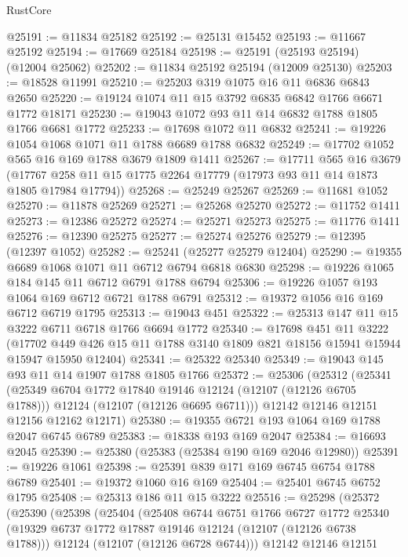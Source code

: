 \begin{lexlean}{RustCore}
\begin{coremodule}
@25191 := @11834 @25182
@25192 := @25131 @15452
@25193 := @11667 @25192
@25194 := @17669 @25184
@25198 := @25191 (@25193 @25194) (@12004 @25062)
@25202 := @11834 @25192 @25194 (@12009 @25130)
@25203 := @18528 @11991
@25210 := @25203 @319 @1075 @16 @11 @6836 @6843 @2650
@25220 := @19124 @1074 @11 @15 @3792 @6835 @6842 @1766 @6671 @1772 @18171
@25230 := @19043 @1072 @93 @11 @14 @6832 @1788 @1805 @1766 @6681 @1772
@25233 := @17698 @1072 @11 @6832
@25241 := @19226 @1054 @1068 @1071 @11 @1788 @6689 @1788 @6832
@25249 := @17702 @1052 @565 @16 @169 @1788 @3679 @1809 @1411
@25267 := @17711
    @565
    @16
    @3679
    (@17767 @258 @11 @15 @1775 @2264 @17779 (@17973 @93 @11 @14 @1873 @1805 @17984 @17794))
@25268 := @25249 @25267
@25269 := @11681 @1052
@25270 := @11878 @25269
@25271 := @25268 @25270
@25272 := @11752 @1411
@25273 := @12386 @25272
@25274 := @25271 @25273
@25275 := @11776 @1411
@25276 := @12390 @25275
@25277 := @25274 @25276
@25279 := @12395 (@12397 @1052)
@25282 := @25241 (@25277 @25279 @12404)
@25290 := @19355 @6689 @1068 @1071 @11 @6712 @6794 @6818 @6830
@25298 := @19226 @1065 @184 @145 @11 @6712 @6791 @1788 @6794
@25306 := @19226 @1057 @193 @1064 @169 @6712 @6721 @1788 @6791
@25312 := @19372 @1056 @16 @169 @6712 @6719 @1795
@25313 := @19043 @451
@25322 := @25313 @147 @11 @15 @3222 @6711 @6718 @1766 @6694 @1772
@25340 := @17698
    @451
    @11
    @3222
    (@17702 @449 @426 @15 @11 @1788 @3140 @1809 @821 @18156 @15941 @15944 @15947 @15950 @12404)
@25341 := @25322 @25340
@25349 := @19043 @145 @93 @11 @14 @1907 @1788 @1805 @1766
@25372 := @25306
    (@25312
      (@25341
        (@25349 @6704 @1772 @17840 @19146 @12124 (@12107 (@12126 @6705 @1788)))
        @12124
        (@12107 (@12126 @6695 @6711)))
      @12142
      @12146
      @12151
      @12156
      @12162
      @12171)
@25380 := @19355 @6721 @193 @1064 @169 @1788 @2047 @6745 @6789
@25383 := @18338 @193 @169 @2047
@25384 := @16693 @2045
@25390 := @25380 (@25383 (@25384 @190 @169 @2046 @12980))
@25391 := @19226 @1061
@25398 := @25391 @839 @171 @169 @6745 @6754 @1788 @6789
@25401 := @19372 @1060 @16 @169
@25404 := @25401 @6745 @6752 @1795
@25408 := @25313 @186 @11 @15 @3222
@25516 := @25298
    (@25372
      (@25390
        (@25398
          (@25404
            (@25408
              @6744
              @6751
              @1766
              @6727
              @1772
              @25340
              (@19329 @6737 @1772 @17887 @19146 @12124 (@12107 (@12126 @6738 @1788)))
              @12124
              (@12107 (@12126 @6728 @6744)))
            @12142
            @12146
            @12151

\end{coremodule}
\end{lexlean}
